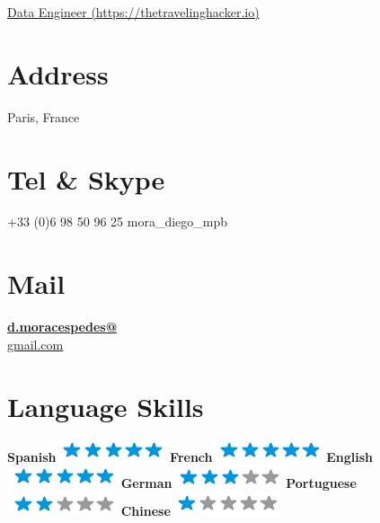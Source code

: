 \documentclass[]{friggeri-cv}
\begin{document}
      {\href{https://thetravelinghacker.io}{Data Engineer (https://thetravelinghacker.io)}}
      

\begin{aside}
  \section{Address}
    Paris, France 
  \section{Tel \& Skype}
    +33 (0)6 98 50 96 25
    mora\_diego\_mpb
  \section{Mail}
    \href{mailto:d.moracespedes@gmail.com}{\textbf{d.moracespedes@}\\gmail.com}
  \section{Language Skills}
    \textbf{Spanish}\includegraphics[scale=0.40]{img/5stars.png}
    \textbf{French}\includegraphics[scale=0.40]{img/5stars.png}
    \textbf{English}\includegraphics[scale=0.40]{img/5stars.png}
    \textbf{German}\includegraphics[scale=0.40]{img/3stars.png}
    \textbf{Portuguese}\includegraphics[scale=0.40]{img/2stars.png}
    \textbf{Chinese}\includegraphics[scale=0.40]{img/1stars.png}

\end{aside}
\end{document}
